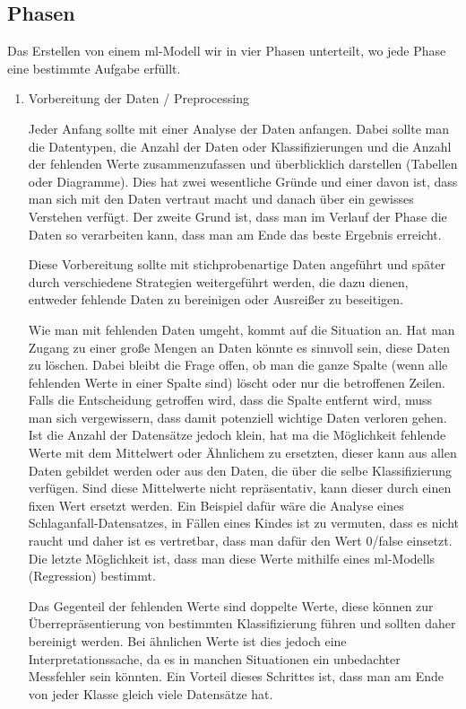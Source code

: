 \subsection{Phasen}

Das Erstellen von einem \Gls{ml}-Modell wir in vier Phasen unterteilt, wo jede Phase eine bestimmte Aufgabe erfüllt.

\begin{enumerate}
      \item Vorbereitung der Daten / Preprocessing

            Jeder Anfang sollte mit einer Analyse der Daten anfangen. Dabei sollte man die Datentypen, die Anzahl der Daten oder Klassifizierungen und die Anzahl der fehlenden Werte zusammenzufassen und überblicklich darstellen (Tabellen oder Diagramme). Dies hat zwei wesentliche Gründe und einer davon ist, dass man sich mit den Daten vertraut macht und danach über ein gewisses Verstehen verfügt. Der zweite Grund ist, dass man im Verlauf der Phase die Daten so verarbeiten kann, dass man am Ende das beste Ergebnis erreicht.

            Diese Vorbereitung sollte mit stichprobenartige Daten angeführt und später durch verschiedene Strategien weitergeführt werden, die dazu dienen, entweder fehlende Daten zu bereinigen oder Ausreißer zu beseitigen.

            Wie man mit fehlenden Daten umgeht, kommt auf die Situation an.
            Hat man Zugang zu einer große Mengen an Daten könnte es sinnvoll sein, diese Daten zu löschen. Dabei bleibt die Frage offen, ob man die ganze Spalte (wenn alle fehlenden Werte in einer Spalte sind) löscht oder nur die betroffenen Zeilen. Falls die Entscheidung getroffen wird, dass die Spalte entfernt wird, muss man sich vergewissern, dass damit potenziell wichtige Daten verloren gehen. Ist die Anzahl der Datensätze jedoch klein, hat ma die Möglichkeit fehlende Werte mit dem Mittelwert oder Ähnlichem zu ersetzten, dieser kann aus allen Daten gebildet werden oder aus den Daten, die über die selbe Klassifizierung verfügen. Sind diese Mittelwerte nicht repräsentativ, kann dieser durch einen fixen Wert ersetzt werden. Ein Beispiel dafür wäre die Analyse eines Schlaganfall-Datensatzes, in Fällen eines Kindes ist zu vermuten, dass es nicht raucht und daher ist es vertretbar, dass man dafür den Wert 0/false einsetzt. Die letzte Möglichkeit ist, dass man diese Werte mithilfe eines \gls{ml}-Modells (Regression) bestimmt. \cite{MLkg}

            Das Gegenteil der fehlenden Werte sind doppelte Werte, diese können zur Überrepräsentierung von bestimmten Klassifizierung führen und sollten daher bereinigt werden. Bei ähnlichen Werte ist dies jedoch eine Interpretationssache, da es in manchen Situationen ein unbedachter Messfehler sein könnten. Ein Vorteil dieses Schrittes ist, dass man am Ende von jeder Klasse gleich viele Datensätze hat.


\end{enumerate}
